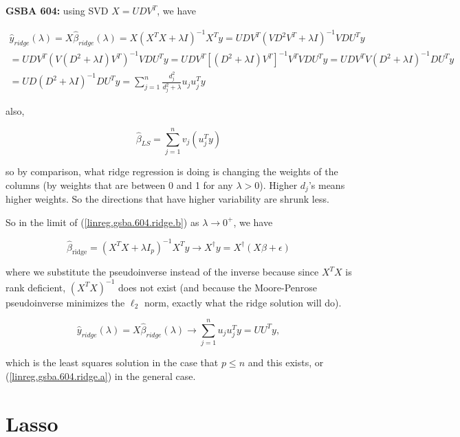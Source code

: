 \textbf{GSBA 604:} using SVD \(X = UDV^T\), we have


%
%

\begin{multline}\label{linreg.gsba.604.ridge.b}
\hat{y}_{ridge}(\lambda) = X \hat{\beta}_{ridge}(\lambda) = X(X^TX + \lambda I)^{-1} X^Ty  = UDV^T( V D^2V^T + \lambda I)^{-1} V D U^T y 
\\  = UDV^T( V ( D^2 + \lambda I) V^T )^{-1} V D U^T y   = UDV^T [( D^2 + \lambda I) V^T]^{-1} V^{T}  V D U^T y  = UDV^T  V ( D^2 + \lambda I)^{-1}  D U^T y   
\\   = UD(D^2 +  \lambda I)^{-1} D U^T y = \sum_{j=1}^n \frac{d_j^2}{d_j^2 + \lambda} u_j u_j^T y
\end{multline}

also,

\[
\hat{\beta}_{LS} = \sum_{j=1}^n v_j (u_j^Ty)
\]

so by comparison, what ridge regression is doing is changing the weights of the columns (by weights that are between 0 and 1 for any \(\lambda > 0\)). Higher \(d_j\)'s means higher weights. So the directions that have higher variability are shrunk less.

So in the limit of (\ref{linreg.gsba.604.ridge.b}) as \(\lambda \to 0^+\), we have 

\begin{equation}\label{linreg.gsba.604.ridge.a}
\hat{\beta}_{\text{ridge}} = (X^TX + \lambda I_p)^{-1}X^Ty \to X^{\dagger}y = X^{\dagger}(X \beta + \epsilon)
\end{equation}


where we substitute the pseudoinverse instead of the inverse because since \(X^TX\) is rank deficient, \((X^TX)^{-1}\) does not exist (and because the Moore-Penrose pseudoinverse minimizes the \(\ell_2\) norm, exactly what the ridge solution will do). 

\[
\hat{y}_{ridge}(\lambda) = X \hat{\beta}_{ridge}(\lambda) \to  \sum_{j=1}^n  u_j u_j^T y = U U^T y ,
\]

which is the least squares solution in the case that \(p \leq n\) and this exists, or (\ref{linreg.gsba.604.ridge.a}) in the general case.

\section{Lasso}

